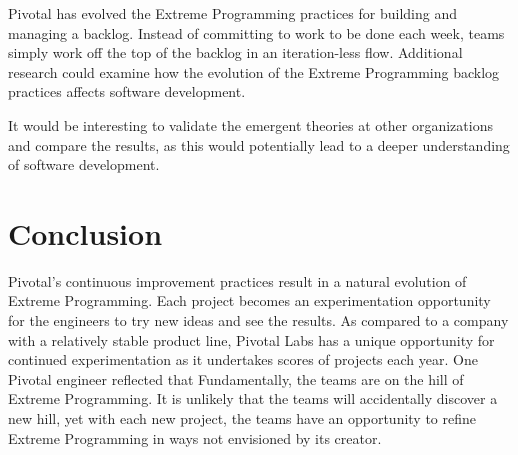 Pivotal has evolved the Extreme Programming practices for building and managing a backlog. Instead of committing to work to be done each week, teams simply work off the top of the backlog in an iteration-less flow. Additional research could examine how the evolution of the Extreme Programming backlog practices affects software development.


It would be interesting to validate the emergent theories at other organizations and compare the results, as this would potentially lead to a deeper understanding of software development. 
\section{Conclusion}
Pivotal's continuous improvement practices result in a natural evolution of Extreme Programming.  Each project becomes an experimentation opportunity for the engineers to try new ideas and see the results. As compared to a company with a relatively stable product line, Pivotal Labs has a unique opportunity for continued experimentation as it undertakes scores of projects each year. One Pivotal engineer reflected that  Fundamentally, the teams are on the hill of Extreme Programming. It is unlikely that the teams will accidentally discover a new hill, yet with each new project, the teams have an opportunity to refine Extreme Programming in ways not envisioned by its creator. 




